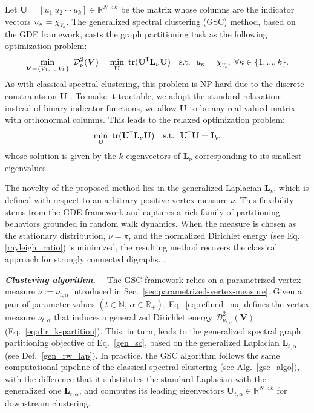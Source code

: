 \documentclass[10pt]{article} %
\def\eqref#1{equation~\ref{#1}}
\def\rmL{{\mathbf{L}}}
\def\rmU{{\mathbf{U}}}
\newcommand{\GSC}{GSC\xspace}
\newcommand{\GDE}{GDE\xspace}
\newcommand{\D}[2]{\mathcal{D}^2_{#1}(#2)}
\renewcommand{\dots}{...}
\renewcommand*{\top}{{\mkern-1.4mu\mathsf{T}}}
\newcommand{\chivec}[1] {{\chi_{\raisebox{-0.15em}{\scalebox{0.6}{$#1$}}}}}
\renewcommand{\eqref}[1]{\ref{#1}}
\newcommand{\inlinetitle}[2]{\noindent\textbf{\textit{#1}{#2}}~~}
\begin{document}
Let $\rmU = [u_1 \ u_2 \ \cdots \ u_k] \in \mathbb{R}^{N \times k}$ be the matrix whose columns are the indicator vectors $u_\kappa = \chivec{V_\kappa}$. The generalized spectral clustering (GSC) method, based on the \GDE framework, casts the graph partitioning task as the following optimization problem:
\begin{equation}\label{eq:gen_sc_1}
  \min_{\boldsymbol{V} = \{V_1, \dots, V_k\}} \ \D{\nu}{\boldsymbol{V}}
  = \min_{\rmU} \ \textnormal{tr}(\rmU^\top \rmL_\nu \rmU)
  \quad \textnormal{s.t.} \ \ u_\kappa = \chivec{V_\kappa},\ \forall \kappa \in \{1,\dots,k\}.
\end{equation}
%
As with classical spectral clustering, this problem is \textnormal{NP}-hard due to the discrete constraints on $\rmU$ \citep{von2007tutorial}. To make it tractable, we adopt the standard relaxation: instead of binary indicator functions, we allow $\rmU$ to be any real-valued matrix with orthonormal columns. This leads to the relaxed optimization problem:
\begin{equation}\label{gen_sc}
  \min_{\rmU} \ \textnormal{tr}(\rmU^\top \rmL_\nu \rmU)
  \quad \textnormal{s.t.} \ \ \rmU^\top \rmU = \mathbf{I}_k,
\end{equation}
whose solution is given by the $k$ eigenvectors of $\rmL_\nu$ corresponding to its smallest eigenvalues.

The novelty of the proposed method lies in the generalized Laplacian $\rmL_\nu$, which is defined with respect to an arbitrary positive vertex measure $\nu$. This flexibility stems from the \GDE framework and captures a rich family of partitioning behaviors grounded in random walk dynamics. When the measure is chosen as the stationary distribution, $\nu = \pi$, and the normalized Dirichlet energy (see Eq.\,\eqref{rayleigh_ratio}) is minimized, the resulting method recovers the classical approach for strongly connected digraphs. \citep{zhou2005learning}.

\inlinetitle{Clustering algorithm}{.}%
The \GSC framework relies on a parametrized vertex measure $\nu := \nu_{t,\alpha}$ introduced in Sec.~\ref{sec:parametrized-vertex-measure}. Given a pair of parameter values $(t \in \mathbb{N}, \,\alpha \in \mathbb{R}_+)$, Eq.~\ref{eq:refined_nu} defines the vertex measure $\nu_{t,\alpha}$ that induces a generalized Dirichlet energy $\D{\nu_{t,\alpha}}{\boldsymbol{V}}$ (Eq.~\ref{eq:dir_k-partition}). This, in turn, leads to the generalized spectral graph partitioning objective of Eq.~\ref{gen_sc}, based on the generalized Laplacian $\rmL_{t,\alpha}$ (see Def.~\ref{gen_rw_lap}).
%
In practice, the \GSC algorithm follows the same computational pipeline of the classical spectral clustering (see Alg.~\ref{gsc_algo}), with the difference that it substitutes the standard Laplacian with the generalized one $\rmL_{t,\alpha}$, and computes its leading eigenvectors $\rmU_{t,\alpha} \in \mathbb{R}^{N \times k}$ for downstream clustering.
\end{document}
